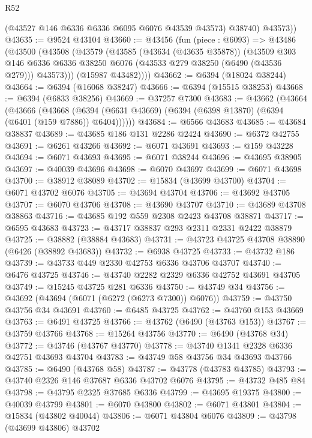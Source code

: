 \begin{lexlean}{R52}
\begin{coremodule}
          (@43527 @146 @6336 @6336 @6095 @6076 @43539 @43573)
          @38740)
        @43573))
@43635 := @9524 @43104
@43660 := @43456
    (fun (piece : @6093) =>
    @43486
      (@43500
        (@43508
          (@43579
            (@43585
              (@43634 (@43635 @35878))
              (@43509
                @303
                @146
                @6336
                @6336
                @38250
                @6076
                (@43533 @279 @38250 (@6490 (@43536 @279)))
                @43573)))
          (@15987 @43482))))
@43662 := @6394 (@18024 @38244)
@43664 := @6394 (@16068 @38247)
@43666 := @6394 (@15515 @38253)
@43668 := @6394 (@6833 @38256)
@43669 := @37257 @7300
@43683 := @43662
    (@43664
      (@43666
        (@43668 (@6394 (@6631 @43669) (@6394 (@6398 @13870) (@6394 (@6401 (@159 @7886)) @6404))))))
@43684 := @6566 @43683
@43685 := @43684 @38837
@43689 := @43685 @186 @131 @2286 @2424
@43690 := @6372 @42755
@43691 := @6261 @43266
@43692 := @6071 @43691
@43693 := @159 @43228
@43694 := @6071 @43693
@43695 := @6071 @38244
@43696 := @43695 @38905
@43697 := @40039 @43696
@43698 := @6070 @43697
@43699 := @6071 @43698
@43700 := @38912 @38089
@43702 := @15834 (@43699 @43700)
@43704 := @6071 @43702 @6076
@43705 := @43694 @43704
@43706 := @43692 @43705
@43707 := @6070 @43706
@43708 := @43690 @43707
@43710 := @43689 @43708 @38863
@43716 := @43685 @192 @559 @2308 @2423 @43708 @38871
@43717 := @6595 @43683
@43723 := @43717 @38837 @293 @2311 @2331 @2422 @38879
@43725 := @38882 (@38884 @43683)
@43731 := @43723 @43725 @43708 @38890 (@6426 (@38892 @43683))
@43732 := @6938 @43725
@43733 := @43732 @186
@43739 := @43733 @449 @2330 @42753 @6336 @43706 @43707
@43740 := @6476 @43725
@43746 := @43740 @2282 @2329 @6336 @42752 @43691 @43705
@43749 := @15245 @43725 @281 @6336
@43750 := @43749 @34
@43756 := @43692 (@43694 (@6071 (@6272 (@6273 @7300)) @6076))
@43759 := @43750 @43756 @34 @43691
@43760 := @6485 @43725
@43762 := @43760 @153 @43669
@43763 := @6491 @43725
@43766 := @43762 (@6490 (@43763 @153))
@43767 := @43759 @43766
@43768 := @15264 @43756
@43770 := @6490 (@43768 @34)
@43772 := @43746 (@43767 @43770)
@43778 := @43740 @1341 @2328 @6336 @42751 @43693 @43704
@43783 := @43749 @58 @43756 @34 @43693 @43766
@43785 := @6490 (@43768 @58)
@43787 := @43778 (@43783 @43785)
@43793 := @43740 @2326 @146 @37687 @6336 @43702 @6076
@43795 := @43732 @485 @84
@43798 := @43795 @2325 @37685 @6336
@43799 := @43695 @19375
@43800 := @40039 @43799
@43801 := @6070 @43800
@43802 := @6071 @43801
@43804 := @15834 (@43802 @40044)
@43806 := @6071 @43804 @6076
@43809 := @43798 (@43699 @43806) @43702

\end{coremodule}
\end{lexlean}
